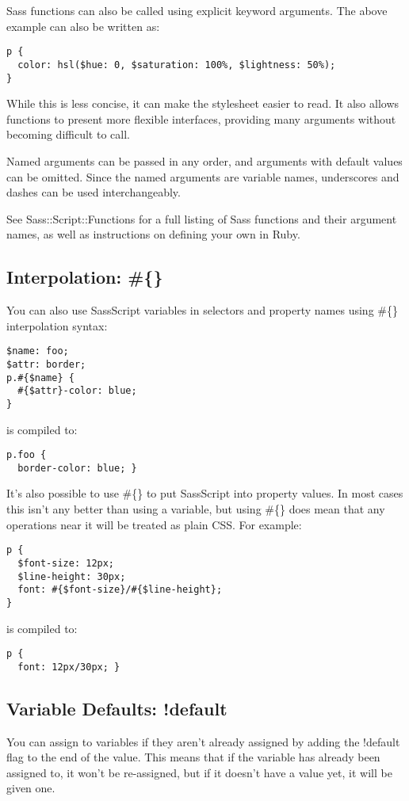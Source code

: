 \documentclass[9pt]{article}
\begin{document}
 Sass functions can also be called using explicit keyword arguments. The above example can also be written as:
\begin{verbatim}
p {
  color: hsl($hue: 0, $saturation: 100%, $lightness: 50%);
}
\end{verbatim}


 While this is less concise, it can make the stylesheet easier to read. It also allows functions to present more flexible interfaces, providing many arguments without becoming difficult to call.


 Named arguments can be passed in any order, and arguments with default values can be omitted. Since the named arguments are variable names, underscores and dashes can be used interchangeably.


 See Sass::Script::Functions for a full listing of Sass functions and their argument names, as well as instructions on defining your own in Ruby.
\subsection{Interpolation: \#\{\}}


 You can also use SassScript variables in selectors and property names using \#\{\} interpolation syntax:
\begin{verbatim}
$name: foo;
$attr: border;
p.#{$name} {
  #{$attr}-color: blue;
}
\end{verbatim}


 is compiled to:
\begin{verbatim}
p.foo {
  border-color: blue; }
\end{verbatim}


 It’s also possible to use \#\{\} to put SassScript into property values. In most cases this isn’t any better than using a variable, but using \#\{\} does mean that any operations near it will be treated as plain CSS. For example:
\begin{verbatim}
p {
  $font-size: 12px;
  $line-height: 30px;
  font: #{$font-size}/#{$line-height};
}
\end{verbatim}


 is compiled to:
\begin{verbatim}
p {
  font: 12px/30px; }
\end{verbatim}
\subsection{Variable Defaults: !default}


 You can assign to variables if they aren’t already assigned by adding the !default flag to the end of the value. This means that if the variable has already been assigned to, it won’t be re-assigned, but if it doesn’t have a value yet, it will be given one.
\end{document}
